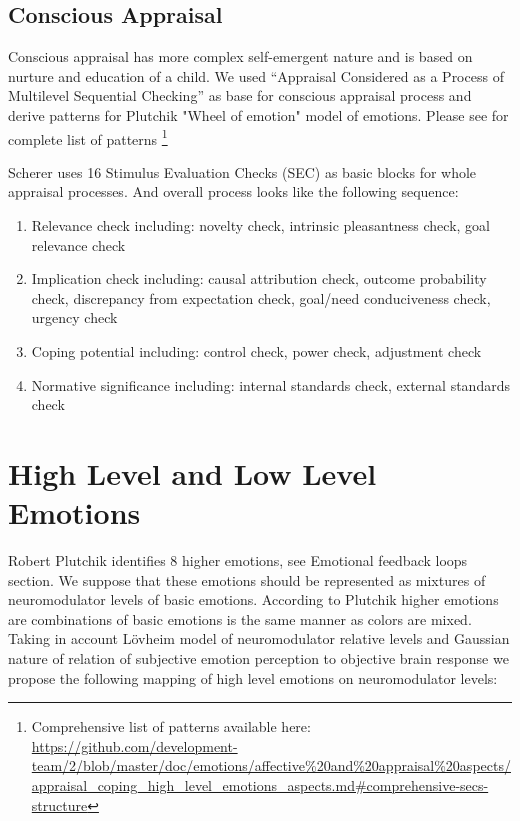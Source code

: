\subsection{Conscious Appraisal}

Conscious appraisal has more complex self-emergent nature and is based on nurture and education of a child. We used ``Appraisal Considered as a Process of Multilevel Sequential Checking'' \cite{appraisal_considered_as_a_process} as base for conscious appraisal process and derive patterns for Plutchik "Wheel of emotion" model of emotions. Please see for complete list of patterns
\footnote{Comprehensive list of patterns available here: \url{
https://github.com/development-team/2/blob/master/doc/emotions/affective\%20and\%20appraisal\%20aspects/appraisal_coping_high_level_emotions_aspects.md#comprehensive-secs-structure}}

Scherer uses 16 Stimulus Evaluation Checks (SEC) as basic blocks for whole appraisal processes. And overall process looks like the following sequence:

\begin{enumerate}
 \item  Relevance check including: novelty check, intrinsic pleasantness check, goal relevance check
 \item  Implication check including: causal attribution check, outcome probability check, discrepancy from expectation check, goal/need conduciveness check, urgency check
 \item  Coping potential including: control check, power check, adjustment check
 \item  Normative significance including: internal standards check, external standards check
\end{enumerate}

\section{High Level and Low Level Emotions}

Robert Plutchik \cite{natureofemotions} identifies 8 higher emotions, see Emotional feedback loops section. We suppose that these emotions should be represented as mixtures of neuromodulator levels of basic emotions. According to Plutchik higher emotions are combinations of basic emotions is the same manner as colors are mixed. Taking in account L\"{o}vheim model of neuromodulator relative levels and Gaussian nature of relation of subjective emotion perception to objective brain response \cite{senticcomputing, neuralcorrelatesofhate} we propose the following mapping of high level emotions on neuromodulator levels:


